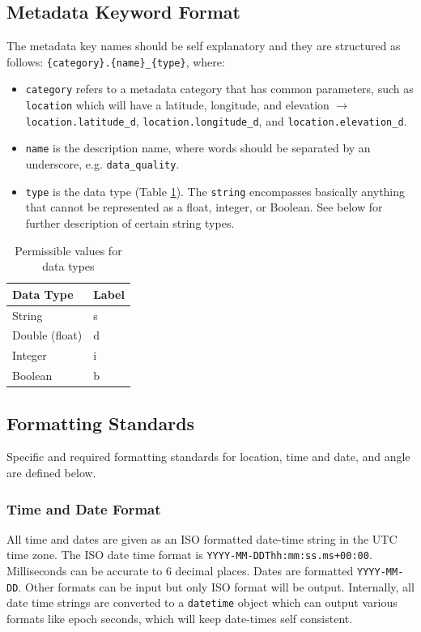 \documentclass{article}
\begin{document}
\subsection{Metadata Keyword Format}

The metadata key names should be self explanatory and they are structured as follows: \verb|{category}.{name}_{type}|, where:
\begin{itemize}
	\item \verb|category| refers to a metadata category that has common parameters, such as \verb|location| which will have a latitude, longitude, and elevation $\longrightarrow$ \verb|location.latitude_d|, \verb|location.longitude_d|, and \verb|location.elevation_d|.
	\item \verb|name| is the description name, where words should be separated by an underscore, e.g. \verb|data_quality|.
	\item \verb|type| is the data type (Table \ref{tab:types}). The \verb|string| encompasses basically anything that cannot be represented as a float, integer, or Boolean.  See below for further description of certain string types.    
\end{itemize}   

\begin{table}[htb!]
	\caption[Data types]{Permissible values for data types}
	\begin{tabular}{|l|l|}
		\hline
		\textbf{Data Type} & \textbf{Label} \\
		\hline
		String & s \\ \hline
		Double (float) & d \\ \hline
		Integer & i \\ \hline
		Boolean & b \\ \hline
	\end{tabular}
	\label{tab:types}
\end{table}

\subsection{Formatting Standards}

Specific and required formatting standards for location, time and date, and angle are defined below.

\subsubsection{Time and Date Format}

All time and dates are given as an ISO formatted date-time string in the UTC time zone.  The ISO date time format is \verb|YYYY-MM-DDThh:mm:ss.ms+00:00|.  Milliseconds can be accurate to 6 decimal places.  Dates are formatted \verb|YYYY-MM-DD|.  Other formats can be input but only ISO format will be output.  Internally, all date time strings are converted to a \verb|datetime| object which can output various formats like epoch seconds, which will keep date-times self consistent.
\end{document}
